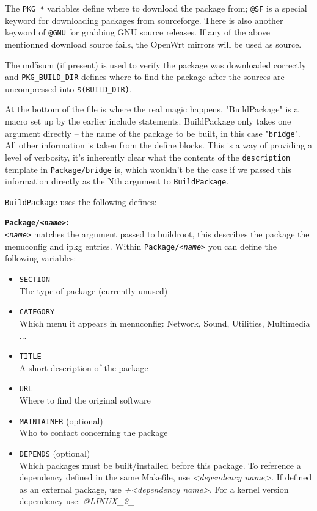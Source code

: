 The \texttt{PKG\_*} variables define where to download the package from;
\texttt{@SF} is a special keyword for downloading packages from sourceforge. There is also
another keyword of \texttt{@GNU} for grabbing GNU source releases. If any of the above mentionned download source fails, the OpenWrt mirrors will be used as source.

The md5sum (if present) is used to verify the package was downloaded correctly and
\texttt{PKG\_BUILD\_DIR} defines where to find the package after the sources are
uncompressed into \texttt{\$(BUILD\_DIR)}.

At the bottom of the file is where the real magic happens, "BuildPackage" is a macro
set up by the earlier include statements. BuildPackage only takes one argument directly --
the name of the package to be built, in this case "\texttt{bridge}". All other information
is taken from the define blocks. This is a way of providing a level of verbosity, it's
inherently clear what the contents of the \texttt{description} template in
\texttt{Package/bridge} is, which wouldn't be the case if we passed this information
directly as the Nth argument to \texttt{BuildPackage}.

\texttt{BuildPackage} uses the following defines:

\textbf{\texttt{Package/\textit{<name>}}:} \\
    \texttt{\textit{<name>}} matches the argument passed to buildroot, this describes
    the package the menuconfig and ipkg entries. Within \texttt{Package/\textit{<name>}}
    you can define the following variables:

    \begin{itemize}
        \item \texttt{SECTION} \\
            The type of package (currently unused)
        \item \texttt{CATEGORY} \\
            Which menu it appears in menuconfig: Network, Sound, Utilities, Multimedia ...
        \item \texttt{TITLE} \\
            A short description of the package
        \item \texttt{URL} \\
            Where to find the original software
        \item \texttt{MAINTAINER} (optional) \\
            Who to contact concerning the package
        \item \texttt{DEPENDS} (optional) \\
            Which packages must be built/installed before this package. To reference a dependency defined in the
			same Makefile, use \textit{<dependency name>}. If defined as an external package, use 
			\textit{+<dependency name>}. For a kernel version dependency use: \textit{@LINUX\_2\_<minor version>}
    \end{itemize}

